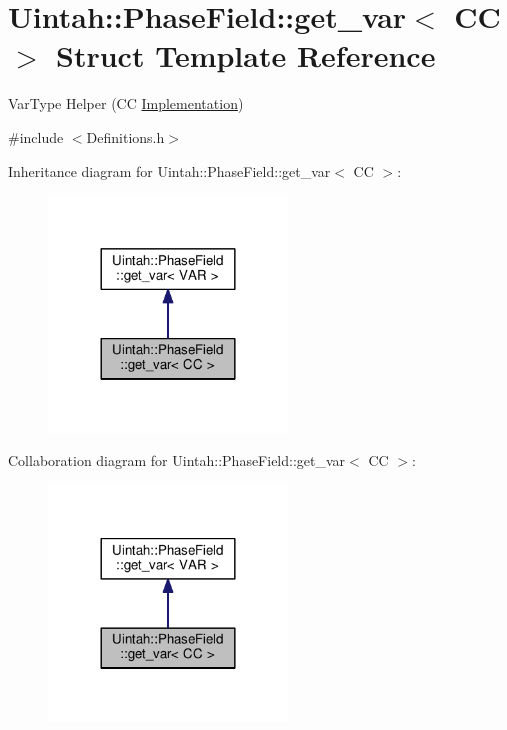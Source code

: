\hypertarget{structUintah_1_1PhaseField_1_1get__var_3_01CC_01_4}{}\section{Uintah\+:\+:Phase\+Field\+:\+:get\+\_\+var$<$ CC $>$ Struct Template Reference}
\label{structUintah_1_1PhaseField_1_1get__var_3_01CC_01_4}


Var\+Type Helper (CC \hyperlink{classUintah_1_1PhaseField_1_1Implementation}{Implementation})  




{\ttfamily \#include $<$Definitions.\+h$>$}



Inheritance diagram for Uintah\+:\+:Phase\+Field\+:\+:get\+\_\+var$<$ CC $>$\+:\nopagebreak
\begin{figure}[H]
\begin{center}
\leavevmode
\includegraphics[width=180pt]{structUintah_1_1PhaseField_1_1get__var_3_01CC_01_4__inherit__graph}
\end{center}
\end{figure}


Collaboration diagram for Uintah\+:\+:Phase\+Field\+:\+:get\+\_\+var$<$ CC $>$\+:\nopagebreak
\begin{figure}[H]
\begin{center}
\leavevmode
\includegraphics[width=180pt]{structUintah_1_1PhaseField_1_1get__var_3_01CC_01_4__coll__graph}
\end{center}
\end{figure}
